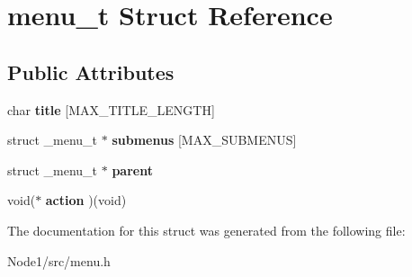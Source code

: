 \hypertarget{structmenu__t}{}\section{menu\+\_\+t Struct Reference}
\label{structmenu__t}
\subsection*{Public Attributes}
\begin{DoxyCompactItemize}
\item 
char {\bfseries title} \mbox{[}M\+A\+X\+\_\+\+T\+I\+T\+L\+E\+\_\+\+L\+E\+N\+G\+TH\mbox{]}\hypertarget{structmenu__t_a6fecb4edd5e12d9e51b823f319550e22}{}\label{structmenu__t_a6fecb4edd5e12d9e51b823f319550e22}

\item 
struct \+\_\+menu\+\_\+t $\ast$ {\bfseries submenus} \mbox{[}M\+A\+X\+\_\+\+S\+U\+B\+M\+E\+N\+US\mbox{]}\hypertarget{structmenu__t_a3d770489a91c64a8ed700a2044a15925}{}\label{structmenu__t_a3d770489a91c64a8ed700a2044a15925}

\item 
struct \+\_\+menu\+\_\+t $\ast$ {\bfseries parent}\hypertarget{structmenu__t_a6c524ea72acefeb959f136f107f1e22f}{}\label{structmenu__t_a6c524ea72acefeb959f136f107f1e22f}

\item 
void($\ast$ {\bfseries action} )(void)\hypertarget{structmenu__t_a2238da03fc4903fc47d5c95361cb537a}{}\label{structmenu__t_a2238da03fc4903fc47d5c95361cb537a}

\end{DoxyCompactItemize}


The documentation for this struct was generated from the following file\+:\begin{DoxyCompactItemize}
\item 
Node1/src/menu.\+h\end{DoxyCompactItemize}
